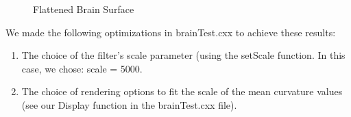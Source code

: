 \documentclass{InsightArticle}
\begin{document}
  \begin{figure}[h]
		\begin{center}
    \end{center}
    \vspace{-.25in} \caption{Flattened Brain Surface}
  \end{figure}  

  We made the following optimizations in brainTest.cxx to achieve
  these results:

  \begin{enumerate}
  \item The choice of the filter's scale parameter (using the setScale
  function. In this case, we chose: scale = 5000.
  \item The choice of rendering options to fit the scale of the mean
  curvature values (see our Display function in the brainTest.cxx
  file).
  \end{enumerate}
  
\end{document}
